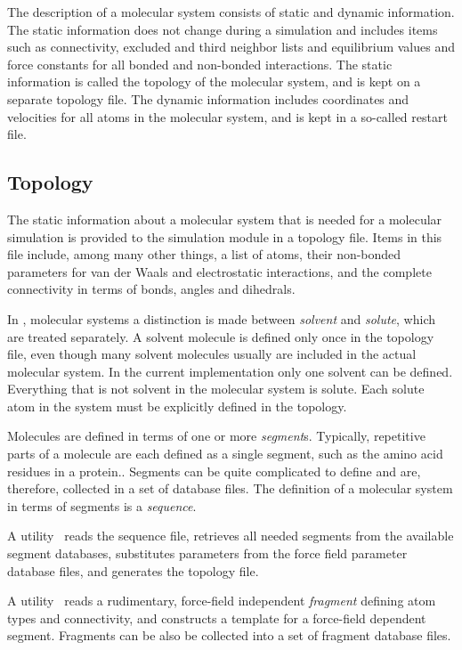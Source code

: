 The description of a molecular system consists of static and dynamic
information. The static information does not change during a
simulation and includes items such as connectivity, excluded and third
neighbor lists and equilibrium values and force constants for all
bonded and non-bonded interactions. The static information is called
the topology of the molecular system, and is kept on a separate
topology file. The dynamic information includes coordinates and
velocities for all atoms in the molecular system, and is kept in a
so-called restart file.

\subsection{Topology}
\label{sec:nwatopology}
The static information about a molecular system that is needed for
a molecular simulation is provided to the simulation module in a
topology file. 
Items in this file include, among many other things, 
a list of atoms, their non-bonded parameters for van der Waals and
electrostatic interactions, and the complete connectivity in terms
of bonds, angles and dihedrals.

In \nwargos, molecular systems a distinction is made between 
{\it solvent} and {\it solute}, which are treated separately.
A solvent molecule is defined only once in the topology file,
even though many solvent molecules usually are included in the
actual molecular system. In the current implementation only one 
solvent can be defined. Everything that is not solvent in the 
molecular system is solute. Each solute atom in the system must 
be explicitly defined in the topology. 

Molecules are defined in terms of one or more {\it segment}s. 
Typically, repetitive parts of a molecule are each defined as a single
segment, such as the amino acid residues in a protein.. 
Segments  can be quite complicated to define and are, therefore, 
collected in a set of database files. 
The definition of a molecular system in terms of segments is a
{\it sequence}.

A utility \nwtop\ reads the sequence file, retrieves all needed 
segments from the available segment databases, substitutes parameters
from the force field parameter database files, and generates the
topology file.

A utility \nwsgm\ reads a rudimentary, force-field independent
{\it fragment} defining atom types and connectivity, and 
constructs a template for a force-field dependent segment.
Fragments can be also be collected into a set of fragment database
files.

